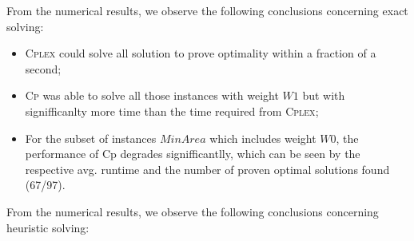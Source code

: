 \documentclass[runningheads,a4paper]{elsarticle}
\begin{document}
        From the numerical results, we observe the following conclusions concerning exact solving:
        \begin{itemize}
        	\item  \textsc{Cplex} could solve all solution to prove optimality within a fraction of a second;
        	\item   \textsc{Cp} was able to solve all those instances with weight $W1$ but with signifficanlty more time than the time required from \textsc{Cplex};
        	\item For the subset of instances $MinArea$ which includes weight $W0$, the performance of Cp degrades signifficantlly, which can be seen  by the respective avg. runtime and the number of proven optimal solutions found (67/97).
        \end{itemize}
     From the numerical results, we observe the following conclusions concerning heuristic solving:
\end{document}
